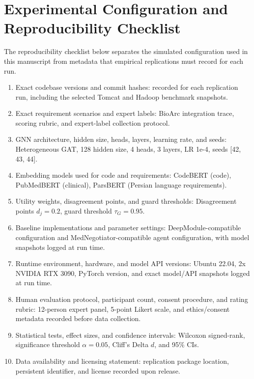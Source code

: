 \documentclass[english,preprint,nonatbib]{elsarticle}
\begin{document}
\section{Experimental Configuration and Reproducibility Checklist}
\label{app:checklist}

The reproducibility checklist below separates the simulated configuration used in this manuscript from metadata that empirical replications must record for each run.

\begin{enumerate}[leftmargin=2em]
  \item Exact codebase versions and commit hashes: recorded for each replication run, including the selected Tomcat and Hadoop benchmark snapshots.
  \item Exact requirement scenarios and expert labels: BioArc integration trace, scoring rubric, and expert-label collection protocol.
  \item GNN architecture, hidden size, heads, layers, learning rate, and seeds: Heterogeneous GAT, 128 hidden size, 4 heads, 3 layers, LR 1e-4, seeds [42, 43, 44].
  \item Embedding models used for code and requirements: CodeBERT (code), PubMedBERT (clinical), ParsBERT (Persian language requirements).
  \item Utility weights, disagreement points, and guard thresholds: Disagreement points $d_j = 0.2$, guard threshold $\tau_G = 0.95$.
  \item Baseline implementations and parameter settings: DeepModule-compatible configuration and MedNegotiator-compatible agent configuration, with model snapshots logged at run time.
  \item Runtime environment, hardware, and model API versions: Ubuntu 22.04, 2x NVIDIA RTX 3090, PyTorch version, and exact model/API snapshots logged at run time.
  \item Human evaluation protocol, participant count, consent procedure, and rating rubric: 12-person expert panel, 5-point Likert scale, and ethics/consent metadata recorded before data collection.
  \item Statistical tests, effect sizes, and confidence intervals: Wilcoxon signed-rank, significance threshold $\alpha=0.05$, Cliff's Delta $d$, and 95\% CIs.
  \item Data availability and licensing statement: replication package location, persistent identifier, and license recorded upon release.
\end{enumerate}



\end{document}
